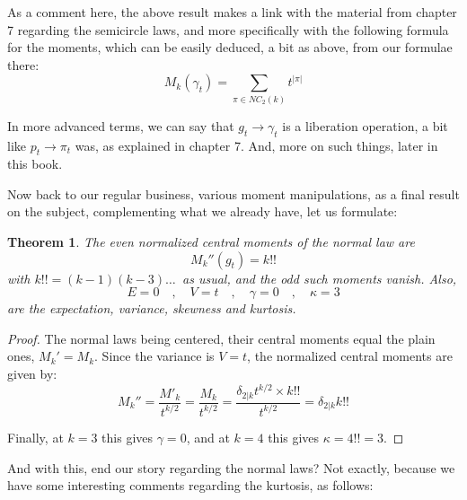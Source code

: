 \documentclass[12pt]{amsbook}
\newtheorem{theorem}{Theorem}[chapter]
\newtheorem{comment}[theorem]{Comment}
\begin{document}
As a comment here, the above result makes a link with the material from chapter 7 regarding the semicircle laws, and more specifically with the following formula for the moments, which can be easily deduced, a bit as above, from our formulae there:
$$M_k(\gamma_t)=\sum_{\pi\in NC_2(k)}t^{|\pi|}$$

In more advanced terms, we can say that $g_t\to\gamma_t$ is a liberation operation, a bit like $p_t\to\pi_t$ was, as explained in chapter 7. And, more on such things, later in this book.

\bigskip

Now back to our regular business, various moment manipulations, as a final result on the subject, complementing what we already have, let us formulate:

\begin{theorem}
The even normalized central moments of the normal law are
$$M_k''(g_t)=k!!$$
with $k!!=(k-1)(k-3)\ldots\,$ as usual, and the odd such moments vanish. Also,
$$E=0\quad,\quad V=t\quad,\quad \gamma=0\quad,\quad \kappa=3$$
are the expectation, variance, skewness and kurtosis.
\end{theorem}

\begin{proof}
The normal laws being centered, their central moments equal the plain ones, $M_k'=M_k$. Since the variance is $V=t$, the normalized central moments are given by:
$$M_k''=\frac{M'_k}{t^{k/2}}=\frac{M_k}{t^{k/2}}=\frac{\delta_{2|k}t^{k/2}\times k!!}{t^{k/2}}=\delta_{2|k}k!!$$

Finally, at $k=3$ this gives $\gamma=0$, and at $k=4$ this gives $\kappa=4!!=3$.
\end{proof}

And with this, end our story regarding the normal laws? Not exactly, because we have some interesting comments regarding the kurtosis, as follows:

\end{document}

